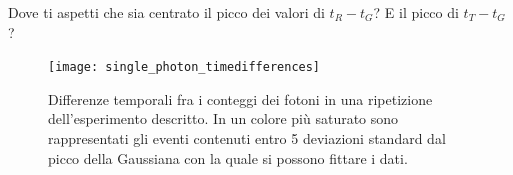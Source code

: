 \documentclass[a4paper,12pt]{article}
\begin{document}
\begin{exo}
    Dove ti aspetti che sia centrato il picco dei valori di \(t_R - t_G\)? E il picco di \(t_T - t_G\)? 
\end{exo}

\begin{figure}[ht]
\centering
\texttt{[image: single\_photon\_timedifferences]}
\caption{Differenze temporali fra i conteggi dei fotoni in una ripetizione dell'esperimento descritto. In un colore più saturato sono rappresentati gli eventi contenuti entro 5 deviazioni standard dal picco della Gaussiana con la quale si possono fittare i dati.}
\label{fig:single_photon_timedifferences}
\end{figure}

\printbibliography
\end{document}

